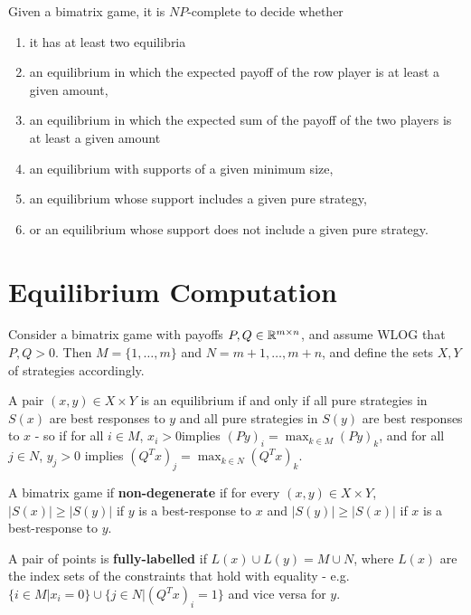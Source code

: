 \begin{thm}
  \label{sec:strat-equil-6}
  Given a bimatrix game, it is $NP$-complete to decide whether
  \begin{enumerate}
  \item it has at least two equilibria
  \item an equilibrium in which the expected payoff of the row player
    is at least a given amount,
  \item an equilibrium in which the expected sum of the payoff of the
    two players is at least a given amount
  \item an equilibrium with supports of a given minimum size,
  \item an equilibrium whose support includes a given pure strategy,
  \item or an equilibrium whose support does not include a given pure
    strategy.
  \end{enumerate}
\end{thm}

\section{Equilibrium Computation}
\label{sec:equil-comp}

\begin{defn}
  \label{sec:equil-comp-1}
  Consider a bimatrix game with payoffs $P, Q \in \mathbb{R}^{m \times n}$,
  and assume WLOG that $P, Q > 0$. Then $M = \{ 1, \dots, m \}$ and $N
  = m+1, \dots, m+n$, and define the sets $X, Y$ of strategies
  accordingly.

  A pair $(x, y) \in X \times Y$ is an equilibrium if and only if all
  pure strategies in $S(x)$ are best responses to $y$ and all pure
  strategies in $S(y)$ are best responses to $x$ - so if for all $i
  \in M$, $x_{i} > 0$implies $(Py)_{i} = \max_{k \in M}(Py)_{k}$, and
  for all $j \in N$, $y_{j} > 0$ implies $(Q^{T} x)_{j} = \max_{k \in
    N} (Q^{T}x)_{k}$.
\end{defn}

\begin{defn}
  \label{sec:equil-comp-2}
  A bimatrix game if \textbf{non-degenerate} if for every $(x, y) \in
  X \times Y$,  $|S(x)| \geq |S(y)|$ if $y$ is a best-response to $x$
  and $|S(y)| \geq |S(x)|$ if $x$ is a best-response to $y$.
\end{defn}

\begin{defn}
  \label{sec:equil-comp-3}
  A pair of points is \textbf{fully-labelled} if $L(x) \cup L(y) = M
  \cup N$, where $L(x)$ are the index sets of the constraints that
  hold with equality - e.g. $\{ i \in M | x_{i} = 0 \} \cup \{ j \in N
  | (Q^{T} x)_{i} = 1\}$ and vice versa for $y$.
\end{defn}

